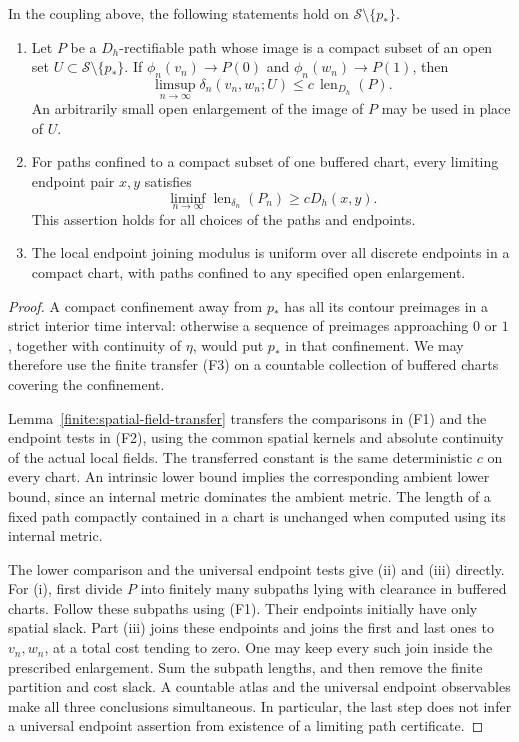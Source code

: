 \begin{lemma}
\label{finite:local-metric}
In the coupling above, the following statements hold on
\(\mathcal S\setminus\{p_*\}\).
\begin{enumerate}[label=(\roman*)]
\item
Let \(P\) be a \(D_h\)-rectifiable path whose image is a compact subset
of an open set \(U\subset\mathcal S\setminus\{p_*\}\).
If \(\phi_n(v_n)\to P(0)\) and \(\phi_n(w_n)\to P(1)\), then
\[
 \limsup_{n\to\infty}
     \delta_n(v_n,w_n;U)
       \le c\,\operatorname{len}_{D_h}(P).
\]
An arbitrarily small open enlargement of the image of \(P\) may be
used in place of \(U\).
\item
For paths confined to a compact subset of one buffered chart, every
limiting endpoint pair \(x,y\) satisfies
\[
       \liminf_{n\to\infty}
          \operatorname{len}_{\delta_n}(P_n)
                  \ge cD_h(x,y).
\]
This assertion holds for all choices of the paths and endpoints.
\item
The local endpoint joining modulus is uniform over all discrete
endpoints in a compact chart, with paths confined to any specified
open enlargement.
\end{enumerate}
\end{lemma}

\begin{proof}
A compact confinement away from \(p_*\) has all its contour preimages
in a strict interior time interval: otherwise a sequence of preimages
approaching \(0\) or \(1\), together with continuity of \(\eta\), would
put \(p_*\) in that confinement.  We may therefore use the finite
transfer (F3) on a countable collection of buffered charts covering
the confinement.

Lemma~\ref{finite:spatial-field-transfer} transfers the comparisons
in (F1) and the endpoint tests in (F2), using the common spatial
kernels and absolute continuity of the actual local fields.  The
transferred constant is the same deterministic \(c\) on every chart.
An intrinsic lower bound implies the corresponding ambient lower
bound, since an internal metric dominates the ambient metric.  The
length of a fixed path compactly contained in a chart is unchanged
when computed using its internal metric.

The lower comparison and the universal endpoint tests give
(ii) and (iii) directly.  For (i), first divide \(P\) into finitely
many subpaths lying with clearance in buffered charts.  Follow these
subpaths using (F1).  Their endpoints initially have only spatial
slack.  Part (iii) joins these endpoints and joins the first and last
ones to \(v_n,w_n\), at a total cost tending to zero.  One may keep
every such join inside the prescribed enlargement.  Sum the
subpath lengths, and then remove the finite partition and cost
slack.  A countable atlas and the universal endpoint observables
make all three conclusions simultaneous.  In particular, the last
step does not infer a universal endpoint assertion from existence
of a limiting path certificate.
\end{proof}

